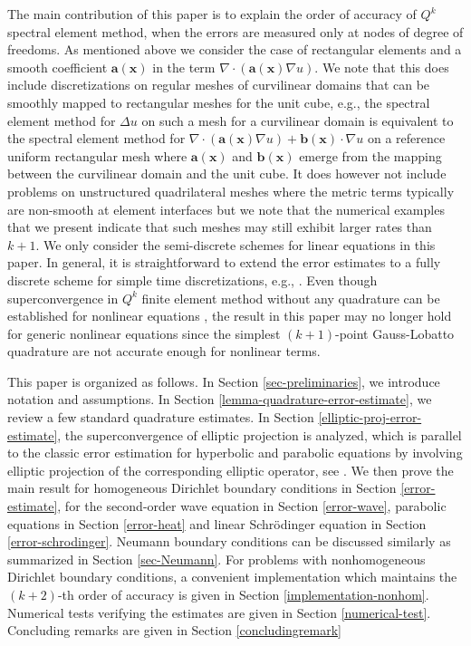 \documentclass[onefignum,onetabnum]{siamart171218}
\begin{document}
 The main contribution of this paper is to explain the order of accuracy of $Q^k$ spectral element method, when the errors are measured only at nodes of degree of freedoms. As mentioned above we consider the case of rectangular elements and a smooth coefficient $\mathbf a(\mathbf x)$ in the term $\nabla\cdot (\mathbf a(\mathbf x)\nabla u)$.  We note that this does include discretizations on regular meshes of curvilinear domains that can be smoothly mapped to rectangular meshes for the unit cube,  e.g., the spectral element method for $\Delta u$ on such a mesh for a curvilinear domain
 is equivalent to the spectral element method for $\nabla\cdot (\mathbf a(\mathbf x)\nabla u)+\mathbf b(\mathbf x)\cdot \nabla u$ on a reference uniform rectangular mesh where $\mathbf a(\mathbf x)$ and $\mathbf b(\mathbf x)$ emerge from the mapping between the curvilinear domain and the unit cube.  It does however not include problems on unstructured quadrilateral meshes where the metric terms typically are non-smooth at element interfaces but we note that the numerical examples that we present indicate that such meshes may still exhibit larger rates than $k+1$.  {  We only consider the semi-discrete schemes for linear equations in this paper. In general, it is straightforward to extend the error estimates to a fully discrete scheme for simple time discretizations, e.g., \cite{wheeler1973priori}. Even though superconvergence in $Q^k$ finite element method without any quadrature can be established for nonlinear equations \cite{chen2001structure}, the result in this paper may no longer hold for generic nonlinear equations since the simplest $(k+1)$-point Gauss-Lobatto quadrature are not accurate enough for nonlinear terms. }
 
This paper is organized as follows. In Section \ref{sec-preliminaries}, we introduce notation and assumptions. In Section \ref{lemma-quadrature-error-estimate}, we review a few standard quadrature estimates. In Section \ref{elliptic-proj-error-estimate}, the superconvergence of elliptic projection is analyzed, which is parallel to the classic error estimation for hyperbolic and parabolic equations by involving elliptic projection of the corresponding elliptic operator, see \cite{wheeler1973priori, sammon1982convergence, dupont19732}. We then prove the main result for homogeneous Dirichlet boundary conditions in Section \ref{error-estimate}, for  the second-order wave equation in Section \ref{error-wave},  parabolic equations   in Section \ref{error-heat}  and linear Schr\"{o}dinger equation in Section \ref{error-schrodinger}. Neumann boundary conditions can be discussed similarly as summarized in Section \ref{sec-Neumann}. For problems with nonhomogeneous Dirichlet boundary conditions, a convenient implementation which maintains the $(k+2)$-th order of accuracy is given in Section \ref{implementation-nonhom}. 
 Numerical tests verifying the estimates are given in Section \ref{numerical-test}.
  Concluding remarks are given in Section \ref{concludingremark}
\end{document}
